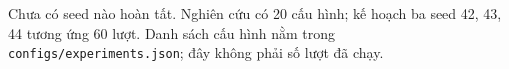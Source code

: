 Chưa có seed nào hoàn tất. Nghiên cứu có 20 cấu hình; kế hoạch ba seed 42, 43, 44 tương ứng 60 lượt. Danh sách cấu hình nằm trong \texttt{configs/experiments.json}; đây không phải số lượt đã chạy.
